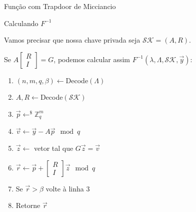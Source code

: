 \documentclass{beamer}
\begin{document}
\begin{frame}{Função com Trapdoor de Micciancio}

\begin{block}{Calculando $F^{-1}$}

Vamos precisar que nossa chave privada seja $\mathcal{SK}=(A, R)$.

Se $A\begin{bmatrix}R\\I\end{bmatrix} = G$, podemos calcular assim $F^{-1}(\lambda,\Lambda,\mathcal{SK},\overrightarrow{y})$:

\begin{enumerate}
    \item $(n, m, q, \beta) \leftarrow $Decode$(\Lambda)$
    \item $A, R \leftarrow$Decode$(\mathcal{SK})$
    \item $\overrightarrow{p}\leftarrow^{\$} \mathbb{Z}_q^m$
    \item $\overrightarrow{v} \leftarrow \overrightarrow{y} - A\overrightarrow{p} \mod q$
    \item $\overrightarrow{z} \leftarrow$ vetor tal que $G\overrightarrow{z}=\overrightarrow{v}$
    \item $\overrightarrow{r} \leftarrow \overrightarrow{p}
+ \begin{bmatrix}R\\I\end{bmatrix}\overrightarrow{z} \mod q$
    \item Se $\overrightarrow{r} > \beta$ volte à linha 3
    \item Retorne $\overrightarrow{r}$
\end{enumerate}
\end{block}

\end{frame}
\end{document}
